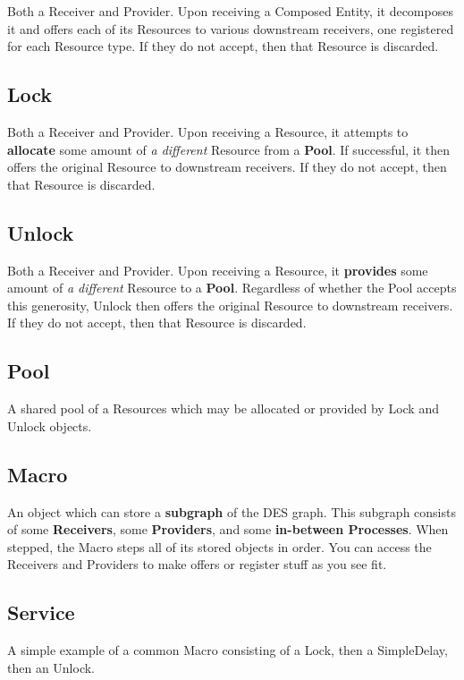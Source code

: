 \documentclass[twoside,10pt]{book}
\begin{document}
Both a Receiver and Provider.  Upon receiving a Composed Entity, it decomposes it and offers each of its Resources to various downstream receivers, one registered for each Resource type. If they do not accept, then that Resource is discarded.  

\subsection{Lock}

Both a Receiver and Provider.  Upon receiving a Resource, it attempts to {\bf allocate} some amount of {\it a different} Resource from a {\bf Pool}.  If successful, it then offers the original Resource to downstream receivers. If they do not accept, then that Resource is discarded.  

\subsection{Unlock}

Both a Receiver and Provider.  Upon receiving a Resource, it {\bf provides} some amount of {\it a different} Resource to a {\bf Pool}.  Regardless of whether the Pool accepts this generosity, Unlock then offers the original Resource to downstream receivers. If they do not accept, then that Resource is discarded.  

\subsection{Pool}

A shared pool of a Resources which may be allocated or provided by Lock and Unlock objects.

\subsection{Macro}

An object which can store a {\bf subgraph} of the DES graph.  This subgraph consists of some {\bf Receivers}, some {\bf Providers}, and some {\bf in-between Processes}.  When stepped, the Macro steps all of its stored objects in order.  You can access the Receivers and Providers to make offers or register stuff as you see fit.

\subsection{Service}

A simple example of a common Macro consisting of a Lock, then a SimpleDelay, then an Unlock.


\cleardoublepage
\footnotesize
{}
\printindex
\end{document}
